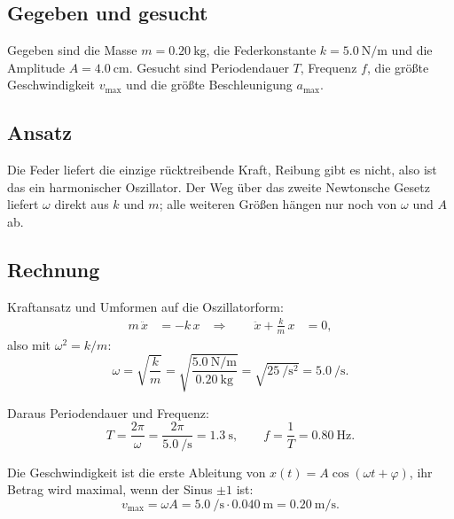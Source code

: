 
\subsection*{Gegeben und gesucht}

Gegeben sind die Masse $m = \qty{0.20}{\kilo\gram}$, die Federkonstante
$k = \qty{5.0}{\newton\per\metre}$ und die Amplitude $A = \qty{4.0}{\centi\metre}$.
Gesucht sind Periodendauer $T$, Frequenz $f$, die größte Geschwindigkeit
$v_{\max}$ und die größte Beschleunigung $a_{\max}$.

\subsection*{Ansatz}

Die Feder liefert die einzige rücktreibende Kraft, Reibung gibt es nicht, also
ist das ein harmonischer Oszillator. Der Weg über das zweite Newtonsche Gesetz
liefert $\omega$ direkt aus $k$ und $m$; alle weiteren Größen hängen nur noch
von $\omega$ und $A$ ab.

\subsection*{Rechnung}

Kraftansatz und Umformen auf die Oszillatorform:
\begin{align}
  m\,\ddot{x} &= -k\,x
  &\Longrightarrow\qquad
  \ddot{x} + \frac{k}{m}\,x &= 0 ,
\end{align}
also mit $\omega^2 = k/m$:
\begin{equation}
  \omega = \sqrt{\frac{k}{m}}
         = \sqrt{\frac{\qty{5.0}{\newton\per\metre}}{\qty{0.20}{\kilo\gram}}}
         = \sqrt{\qty{25}{\per\second\squared}}
         = \qty{5.0}{\per\second} .
\end{equation}

Daraus Periodendauer und Frequenz:
\begin{equation}
  T = \frac{2\pi}{\omega}
    = \frac{2\pi}{\qty{5.0}{\per\second}}
    = \qty{1.3}{\second},
  \qquad
  f = \frac{1}{T} = \qty{0.80}{\hertz} .
\end{equation}

Die Geschwindigkeit ist die erste Ableitung von $x(t) = A\cos(\omega t+\varphi)$,
ihr Betrag wird maximal, wenn der Sinus $\pm 1$ ist:
\begin{equation}
  v_{\max} = \omega A = \qty{5.0}{\per\second}\cdot\qty{0.040}{\metre}
           = \qty{0.20}{\metre\per\second} .
\end{equation}

